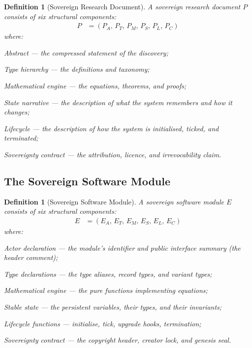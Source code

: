 \documentclass[12pt]{article}
\newtheorem{definition}[theorem]{Definition}
\begin{document}
\begin{definition}[Sovereign Research Document]
  A \emph{sovereign research document} $P$ consists of six structural
  components:
  \begin{align*}
    P &= (P_A,\, P_T,\, P_M,\, P_S,\, P_L,\, P_C)
  \end{align*}
  where:
  \begin{description}[leftmargin=1.2cm]
    \item[$P_A$] Abstract — the compressed statement of the discovery;
    \item[$P_T$] Type hierarchy — the definitions and taxonomy;
    \item[$P_M$] Mathematical engine — the equations, theorems, and proofs;
    \item[$P_S$] State narrative — the description of what the system
                 remembers and how it changes;
    \item[$P_L$] Lifecycle — the description of how the system is initialised,
                 ticked, and terminated;
    \item[$P_C$] Sovereignty contract — the attribution, licence, and
                 irrevocability claim.
  \end{description}
\end{definition}

\subsection{The Sovereign Software Module}

\begin{definition}[Sovereign Software Module]
  A \emph{sovereign software module} $E$ consists of six structural components:
  \begin{align*}
    E &= (E_A,\, E_T,\, E_M,\, E_S,\, E_L,\, E_C)
  \end{align*}
  where:
  \begin{description}[leftmargin=1.2cm]
    \item[$E_A$] Actor declaration — the module's identifier and public
                 interface summary (the header comment);
    \item[$E_T$] Type declarations — the type aliases, record types, and
                 variant types;
    \item[$E_M$] Mathematical engine — the pure functions implementing equations;
    \item[$E_S$] Stable state — the persistent variables, their types, and
                 their invariants;
    \item[$E_L$] Lifecycle functions — initialise, tick, upgrade hooks,
                 termination;
    \item[$E_C$] Sovereignty contract — the copyright header, creator lock,
                 and genesis seal.
  \end{description}
\end{definition}
\end{document}
